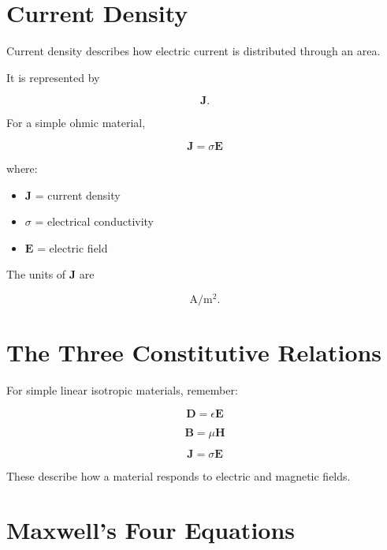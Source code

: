 \documentclass[11pt]{article}
\newcommand{\vect}[1]{\mathbf{#1}}
\begin{document}

\section{Current Density}

Current density describes how electric current is distributed through an area.

It is represented by

\[
\vect{J}.
\]

For a simple ohmic material,

\[
\boxed{
\vect{J}
=
\sigma\vect{E}
}
\]

where:

\begin{itemize}
    \item $\vect{J}$ = current density
    \item $\sigma$ = electrical conductivity
    \item $\vect{E}$ = electric field
\end{itemize}

The units of $\vect{J}$ are

\[
\mathrm{A/m^2}.
\]



\section{The Three Constitutive Relations}

For simple linear isotropic materials, remember:

\[
\boxed{
\vect{D}
=
\epsilon\vect{E}
}
\]

\[
\boxed{
\vect{B}
=
\mu\vect{H}
}
\]

\[
\boxed{
\vect{J}
=
\sigma\vect{E}
}
\]

These describe how a material responds to electric and magnetic fields.



\section{Maxwell's Four Equations}
\end{document}
